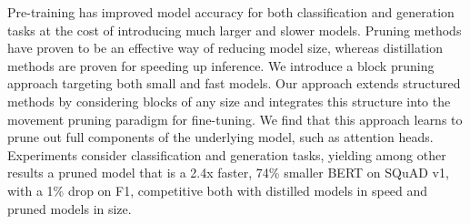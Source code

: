 Pre-training has improved model accuracy for both classification and generation tasks at the cost of introducing much larger and slower models. Pruning methods have proven to be an effective way of reducing model size, whereas distillation methods are proven for speeding up inference. We introduce a block pruning approach targeting both small and fast models. Our approach extends structured methods by considering blocks of any size and integrates this structure into the movement pruning paradigm for fine-tuning. We find that this approach learns to prune out full components of the underlying model, such as attention heads. Experiments consider classification and generation tasks, yielding among other results a pruned model that is a 2.4x faster, 74\% smaller BERT on SQuAD v1, with a 1\% drop on F1, competitive both with distilled models in speed and pruned models in size.
